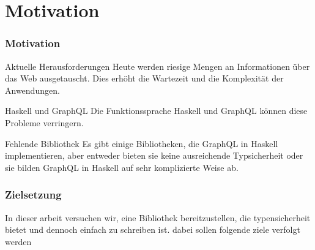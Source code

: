 \section{Motivation}

\begin{frame}\frametitle{Motivation}

    \footnotesize

    \begin{alertblock}{Aktuelle Herausforderungen}
        Heute werden riesige Mengen an Informationen über das Web ausgetauscht. Dies erhöht die \alert{Wartezeit} und die \alert{Komplexität} der Anwendungen. 
    \end{alertblock}

    \begin{alertblock}{Haskell und  GraphQL}
        Die Funktionssprache Haskell und GraphQL können diese Probleme verringern.
    \end{alertblock}

    \begin{block}{Fehlende Bibliothek}
        Es gibt einige Bibliotheken, die GraphQL in Haskell implementieren, aber entweder bieten sie keine ausreichende Typsicherheit oder sie bilden GraphQL in Haskell auf sehr komplizierte Weise ab. 
    \end{block}

\end{frame}

\begin{frame}\frametitle{Zielsetzung}

    In dieser arbeit versuchen wir, eine Bibliothek bereitzustellen,
    die \alert{typensicherheit bietet} und dennoch \alert{einfach zu schreiben} ist. 
    dabei sollen folgende ziele verfolgt werden

\end{frame}